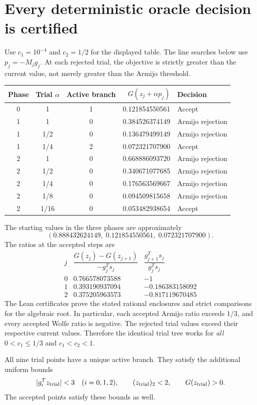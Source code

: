 \section{Every deterministic oracle decision is certified}\label{comp:trial_table}
Use $c_1=10^{-4}$ and $c_2=1/2$ for the displayed table. The line searches below use $p_j=-M_jg_j$. At each rejected trial, the objective is strictly greater than the current value, not merely greater than the Armijo threshold.
\begin{center}\small
\begin{tabular}{cccrl}\toprule
Phase & Trial $\alpha$ & Active branch & $G(z_j+\alpha p_j)$ & Decision\\\midrule
0&1&1&0.121854550561&Accept\\\midrule
1&1&0&0.384526374149&Armijo rejection\\
1&1/2&0&0.136479499149&Armijo rejection\\
1&1/4&2&0.072321707900&Accept\\\midrule
2&1&0&0.668886093720&Armijo rejection\\
2&1/2&0&0.340671077685&Armijo rejection\\
2&1/4&0&0.176563569667&Armijo rejection\\
2&1/8&0&0.094509815658&Armijo rejection\\
2&1/16&0&0.053482938654&Accept\\\bottomrule
\end{tabular}
\end{center}
The starting values in the three phases are approximately
\[
 (0.888432624149,\;0.121854550561,\;0.072321707900).
\]
The ratios at the accepted steps are
\[
\begin{array}{c|rr}
 j & \dfrac{G(z_j)-G(z_{j+1})}{-g_j^Ts_j}
 &\dfrac{g_{j+1}^Ts_j}{g_j^Ts_j}\\\hline
0&0.766578073588&-1\\
1&0.393190937094&-0.186383158092\\
2&0.375205963573&-0.817119670485
\end{array}
\]
The Lean certificates prove the stated rational enclosures and strict comparisons for the algebraic root. In particular, each accepted Armijo ratio exceeds $1/3$, and every accepted Wolfe ratio is negative. The rejected trial values exceed their respective current values. Therefore the identical trial tree works for \emph{all} $0<c_1\le1/3$ and $c_1<c_2<1$.

All nine trial points have a unique active branch. They satisfy the additional uniform bounds
\begin{equation}\label{D:trialbounds}
 |g_i^Tz_{\rm trial}|<3\quad(i=0,1,2),
 \qquad (z_{\rm trial})_2<2,
 \qquad G(z_{\rm trial})>0.
\end{equation}
The accepted points satisfy these bounds as well.

